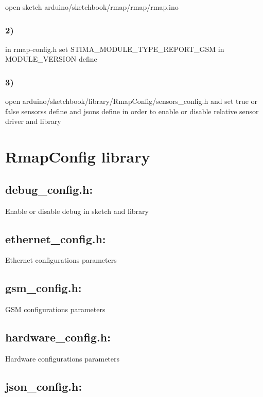 open sketch arduino/sketchbook/rmap/rmap/rmap.\+ino\hypertarget{index_report_gsm_2}{}\subsubsection{2)}\label{index_report_gsm_2}
in rmap-\/config.\+h set S\+T\+I\+M\+A\+\_\+\+M\+O\+D\+U\+L\+E\+\_\+\+T\+Y\+P\+E\+\_\+\+R\+E\+P\+O\+R\+T\+\_\+\+G\+SM in M\+O\+D\+U\+L\+E\+\_\+\+V\+E\+R\+S\+I\+ON define\hypertarget{index_report_gsm_3}{}\subsubsection{3)}\label{index_report_gsm_3}
open arduino/sketchbook/library/\+Rmap\+Config/sensors\+\_\+config.\+h and set true or false sensors\textquotesingle{}s define and json\textquotesingle{}s define in order to enable or disable relative sensor driver and library\hypertarget{index_RmapConfig}{}\section{Rmap\+Config library}\label{index_RmapConfig}
\hypertarget{index_debug_config}{}\subsection{debug\+\_\+config.\+h\+:}\label{index_debug_config}
Enable or disable debug in sketch and library\hypertarget{index_ethernet_config}{}\subsection{ethernet\+\_\+config.\+h\+:}\label{index_ethernet_config}
Ethernet configuration\textquotesingle{}s parameters\hypertarget{index_gsm_config}{}\subsection{gsm\+\_\+config.\+h\+:}\label{index_gsm_config}
G\+SM configuration\textquotesingle{}s parameters\hypertarget{index_hardware_config}{}\subsection{hardware\+\_\+config.\+h\+:}\label{index_hardware_config}
Hardware configuration\textquotesingle{}s parameters\hypertarget{index_json_config}{}\subsection{json\+\_\+config.\+h\+:}\label{index_json_config}
